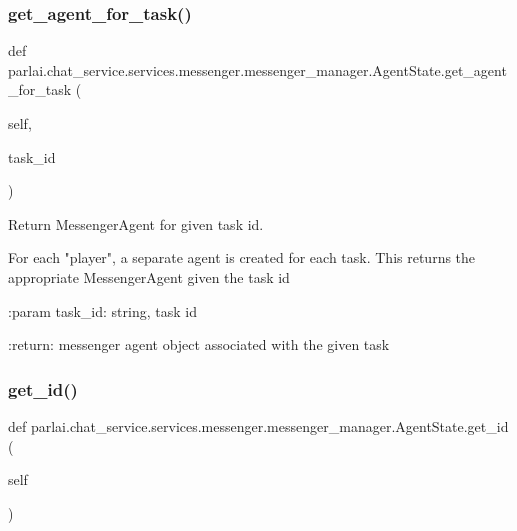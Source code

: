 \subsubsection{\texorpdfstring{get\+\_\+agent\+\_\+for\+\_\+task()}{get\_agent\_for\_task()}}
{\footnotesize\ttfamily def parlai.\+chat\+\_\+service.\+services.\+messenger.\+messenger\+\_\+manager.\+Agent\+State.\+get\+\_\+agent\+\_\+for\+\_\+task (\begin{DoxyParamCaption}\item[{}]{self,  }\item[{}]{task\+\_\+id }\end{DoxyParamCaption})}

\begin{DoxyVerb}Return MessengerAgent for given task id.

For each "player", a separate agent is created for each task. This
returns the appropriate MessengerAgent given the task id

:param task_id:
    string, task id

:return:
    messenger agent object associated with the given task
\end{DoxyVerb}
 \mbox{\label{classparlai_1_1chat__service_1_1services_1_1messenger_1_1messenger__manager_1_1AgentState_aeb7f034a2bfe014172f0a5f127af2bae}} 
\subsubsection{\texorpdfstring{get\+\_\+id()}{get\_id()}}
{\footnotesize\ttfamily def parlai.\+chat\+\_\+service.\+services.\+messenger.\+messenger\+\_\+manager.\+Agent\+State.\+get\+\_\+id (\begin{DoxyParamCaption}\item[{}]{self }\end{DoxyParamCaption})}

